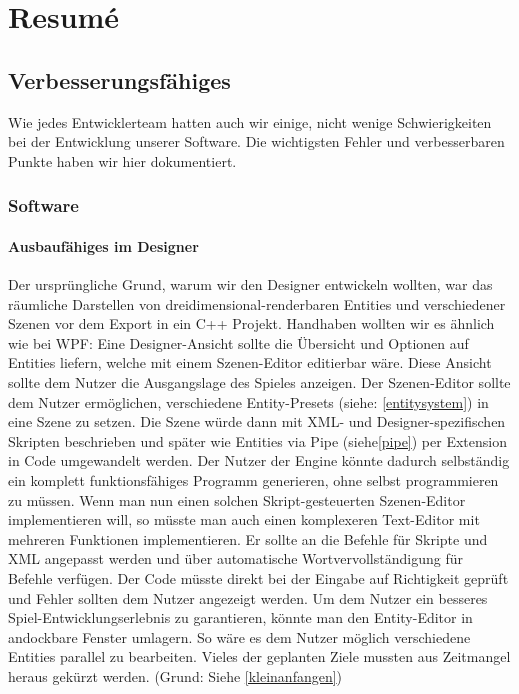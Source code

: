 \chapter{Resumé}

\section{Verbesserungsfähiges}
 Wie jedes Entwicklerteam hatten auch wir einige, nicht wenige Schwierigkeiten bei der Entwicklung unserer Software. Die wichtigsten Fehler und verbesserbaren Punkte haben wir hier dokumentiert.

\subsection{Software}
\subsubsection{Ausbaufähiges im Designer}
Der ursprüngliche Grund, warum wir den Designer entwickeln wollten, war das räumliche Darstellen von dreidimensional-renderbaren Entities und verschiedener Szenen vor dem Export in ein C++ Projekt. Handhaben wollten wir es ähnlich wie bei WPF: Eine Designer-Ansicht sollte die Übersicht und Optionen auf Entities liefern, welche mit einem Szenen-Editor editierbar wäre. Diese Ansicht sollte dem Nutzer die Ausgangslage des Spieles anzeigen.
Der Szenen-Editor sollte dem Nutzer ermöglichen, verschiedene Entity-Presets (siehe: \cref{entitysystem}) in eine Szene zu setzen. Die Szene würde dann mit XML- und Designer-spezifischen Skripten beschrieben und später wie Entities via Pipe (siehe\cref{pipe}) per Extension in Code umgewandelt werden.
Der Nutzer der Engine könnte dadurch selbständig ein komplett funktionsfähiges Programm generieren, ohne selbst programmieren zu müssen.
Wenn man nun einen solchen Skript-gesteuerten Szenen-Editor implementieren will, so müsste man auch einen komplexeren Text-Editor mit mehreren Funktionen implementieren. Er sollte an die Befehle für Skripte und XML angepasst werden und über automatische Wortvervollständigung für Befehle verfügen. Der Code müsste direkt bei der Eingabe auf Richtigkeit geprüft und Fehler sollten dem Nutzer angezeigt werden.
Um dem Nutzer ein besseres Spiel-Entwicklungserlebnis zu garantieren, könnte man den Entity-Editor in andockbare Fenster umlagern. So wäre es dem Nutzer möglich verschiedene Entities parallel zu bearbeiten.
Vieles der geplanten Ziele mussten aus Zeitmangel heraus gekürzt werden. (Grund: Siehe \cref{kleinanfangen})
	
